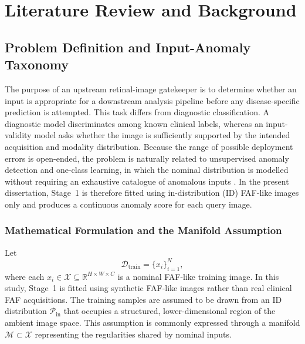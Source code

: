 \documentclass[fleqn,12pt]{olplainarticle}
\begin{document}
\newpage
\section{Literature Review and Background}
\label{sec:literature_review}

\subsection{Problem Definition and Input-Anomaly Taxonomy}
\label{sec:problem}

The purpose of an upstream retinal-image gatekeeper is to determine whether an input is appropriate for a downstream analysis pipeline before any disease-specific prediction is attempted. This task differs from diagnostic classification. A diagnostic model discriminates among known clinical labels, whereas an input-validity model asks whether the image is sufficiently supported by the intended acquisition and modality distribution. Because the range of possible deployment errors is open-ended, the problem is naturally related to unsupervised anomaly detection and one-class learning, in which the nominal distribution is modelled without requiring an exhaustive catalogue of anomalous inputs \cite{ruff2021unifying,hong2024medicalood,heer2021oodblindspot}. In the present dissertation, Stage~1 is therefore fitted using in-distribution (ID) FAF-like images only and produces a continuous anomaly score for each query image.

\subsubsection{Mathematical Formulation and the Manifold Assumption}

Let
\begin{equation}
    \mathcal{D}_{\mathrm{train}}=\{x_i\}_{i=1}^{N},
\end{equation}
where each $x_i\in\mathcal{X}\subseteq\mathbb{R}^{H\times W\times C}$ is a nominal FAF-like training image. In this study, Stage~1 is fitted using synthetic FAF-like images rather than real clinical FAF acquisitions. The training samples are assumed to be drawn from an ID distribution $\mathcal{P}_{\mathrm{in}}$ that occupies a structured, lower-dimensional region of the ambient image space. This assumption is commonly expressed through a manifold $\mathcal{M}\subset\mathcal{X}$ representing the regularities shared by nominal inputs.
\end{document}

